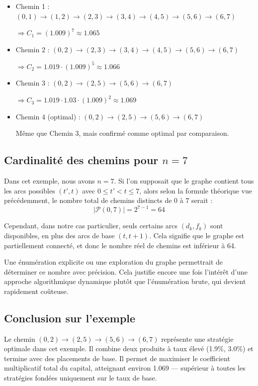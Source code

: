 \documentclass[a4paper,11pt]{article}
\begin{document}
    \begin{itemize}
        \item Chemin 1 : $(0,1) \to (1,2) \to (2,3) \to (3,4) \to (4,5) \to (5,6) \to (6,7)$
    
        \hspace{0.5cm} $\Rightarrow C_1 = (1.009)^7 \approx 1.065$

        \item Chemin 2 : $(0,2) \to (2,3) \to (3,4) \to (4,5) \to (5,6) \to (6,7)$
    
        \hspace{0.5cm} $\Rightarrow C_2 = 1.019 \cdot (1.009)^5 \approx 1.066$

        \item Chemin 3 : $(0,2) \to (2,5) \to (5,6) \to (6,7)$
    
        \hspace{0.5cm} $\Rightarrow C_3 = 1.019 \cdot 1.03 \cdot (1.009)^2 \approx 1.069$

        \item Chemin 4 (optimal) : $(0,2) \to (2,5) \to (5,6) \to (6,7)$

        \hspace{0.5cm} Même que Chemin 3, mais confirmé comme optimal par comparaison.
    \end{itemize}

    \subsection{Cardinalité des chemins pour $n = 7$}
    Dans cet exemple, nous avons $n = 7$. Si l'on supposait que le graphe contient tous les arcs possibles $(t', t)$ avec $0 \leq t' < t \leq 7$, alors selon la formule théorique vue précédemment, le nombre total de chemins distincts de $0$ à $7$ serait :
    \[
    |\mathcal{P}(0, 7)| = 2^{7 - 1} = 64
    \]

    Cependant, dans notre cas particulier, seuls certains arcs $(d_k, f_k)$ sont disponibles, en plus des arcs de base $(t, t+1)$. Cela signifie que le graphe est partiellement connecté, et donc le nombre réel de chemins est inférieur à 64.

    Une énumération explicite ou une exploration du graphe permettrait de déterminer ce nombre avec précision. Cela justifie encore une fois l’intérêt d’une approche algorithmique dynamique plutôt que l’énumération brute, qui devient rapidement coûteuse.


    \subsection{Conclusion sur l’exemple}
    Le chemin $(0,2) \to (2,5) \to (5,6) \to (6,7)$ représente une stratégie optimale dans cet exemple. Il combine deux produits à taux élevé (1.9\%, 3.0\%) et termine avec des placements de base. Il permet de maximiser le coefficient multiplicatif total du capital, atteignant environ 1.069 — supérieur à toutes les stratégies fondées uniquement sur le taux de base.
\end{document}
